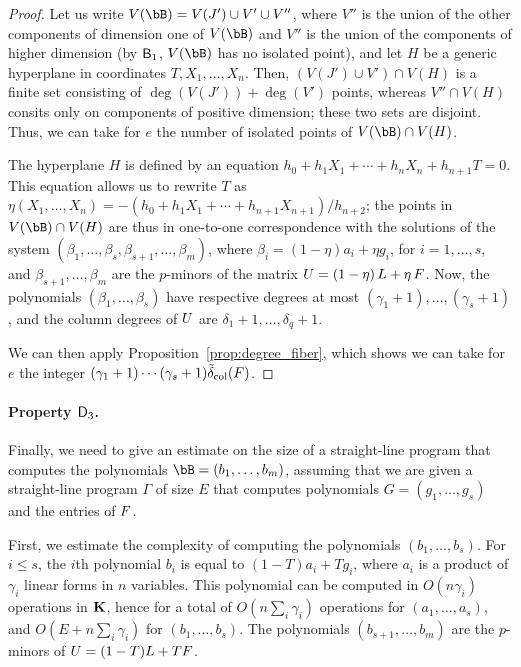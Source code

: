 \documentclass[12pt]{article}
\begin{document}
\begin{proof}
Let us write $V(\bB)=V(J') \cup V' \cup V''$, where $V''$ is the union
of the other components of dimension one of $V(\bB)$ and $V''$ is the
union of the components of higher dimension (by $\mathsf{B}_1$, $V(\bB)$
has no isolated point), and let $H$ be a generic hyperplane in
coordinates $T,X_1,\dots,X_n$. Then, $(V(J') \cup V') \cap V(H)$ is a
finite set consisting of $\deg(V(J')) + \deg(V')$ points, whereas $V''
\cap V(H)$ consits only on components of positive dimension; these two
sets are disjoint. Thus, we can take for $e$ the number of isolated 
points of $V(\bB)\cap V(H)$.

The hyperplane $H$ is defined by an equation
$h_0 + h_1 X_1 + \cdots + h_{n}X_{n} + h_{n+1} T=0$. This equation
allows us to rewrite $T$ as
$\eta(X_1,\dots,X_n)=-(h_0 + h_1 X_1 + \cdots +
h_{n+1}X_{n+1})/h_{n+2}$;
the points in $V(\bB)\cap V(H)$ are thus in one-to-one correspondence
with the solutions of the system
$(\beta_1,\dots,\beta_s,\beta_{s+1},\dots,\beta_m)$, where
$\beta_i=(1-\eta) a_i + \eta g_i$, for $i=1,\dots,s$, and
$\beta_{s+1},\dots,\beta_m$ are the $p$-minors of the matrix
${{U}}=(1-\eta)\, {L} + \eta \, {F} $.  Now, the polynomials
$(\beta_1,\dots,\beta_s)$ have respective degrees at most
$(\gamma_1+1),\dots,(\gamma_s+1)$, and the column degrees of ${{U}}$
are $\delta_1+1,\dots,\delta_q+1$.

We can then apply Proposition~\ref{prop:degree_fiber}, which shows we
can take for $e$ the integer $(\gamma_1+1)\cdots(\gamma_s+1)
\tilde\delta_{\rm col}({F})$.  
\end{proof}

\paragraph{Property $\mathsf{D}_3$.} Finally, we need to give an estimate on
the size of a straight-line program that computes the polynomials
$\bB=(b_1,\dots,b_m)$, assuming that we are given a straight-line
program $\Gamma$ of size $E$ that computes polynomials $G=(g_1,\dots,g_s)$ and
the entries of ${F}$.

First, we estimate the complexity of computing the polynomials
$(b_1,\dots,b_s)$. For $i \le s$, the $i$th polynomial $b_i$ is equal
to $(1-T)a_i + T g_i$, where $a_i$ is a product of $\gamma_i$ linear
forms in $n$ variables. This polynomial can be computed in $O(n
\gamma_i)$ operations in $\mathbf{K}$, hence for a total of $O(n \sum_i
\gamma_i)$ operations for $(a_1,\dots,a_s)$, and $O(E+n \sum_i
\gamma_i)$ for $(b_1,\dots,b_s)$. The polynomials
$(b_{s+1},\dots,b_m)$ are the $p$-minors of ${U}=(1-T){L}+T{F}$.
\end{document}
